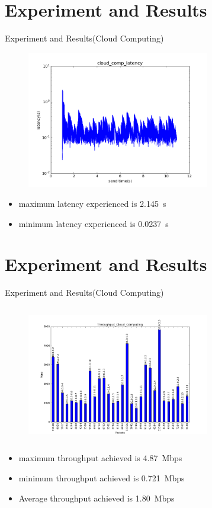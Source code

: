 \documentclass{beamer}
\begin{document}
\section{Experiment and Results}
\begin{frame}{Experiment and Results\big(Cloud Computing\big)}
\begin{figure}
\includegraphics[width=8cm, height=6cm]{newcloudlatency}
\centering
\end{figure}
\begin{itemize}
	\item maximum latency experienced is \SI{2.145}{\second}
	\item minimum latency experienced is \SI{.0237}{\second} 
\end{itemize}

\end{frame}
\section{Experiment and Results}
\begin{frame}{Experiment and Results\big(Cloud Computing\big)}
\begin{figure}
\includegraphics[width=8cm, height=6cm]{cloudth}
\centering
\end{figure}
\begin{itemize}

	\item maximum throughput achieved is \SI{4.87}Mbps
	\item minimum throughput achieved is \SI{0.721}Mbps
	\item Average throughput achieved is \SI{1.80}Mbps
\end{itemize}

\end{frame}
\end{document}
